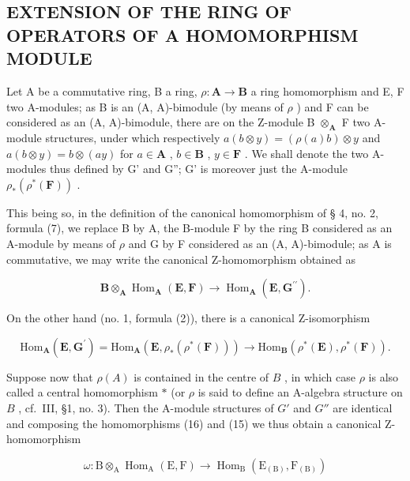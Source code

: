 \subsection{EXTENSION OF THE RING OF OPERATORS OF A HOMOMORPHISM MODULE}

Let A be a commutative ring, B a ring, \(\rho: \mathbf{A} \to \mathbf{B}\) a ring homomorphism and E, F two A-modules; as B is an (A, A)-bimodule (by means of \(\rho\) ) and F can be considered as an (A, A)-bimodule, there are on the Z-module B \(\otimes_{\mathbf{A}}\) F two A-module structures, under which respectively \(a(b \otimes y) = (\rho(a)b) \otimes y\) and \(a(b \otimes y) = b \otimes (ay)\) for \(a \in \mathbf{A}\) , \(b \in \mathbf{B}\) , \(y \in \mathbf{F}\) . We shall denote the two A-modules thus defined by G' and G''; G' is moreover just the A-module \(\rho_*(\rho^*(\mathbf{F}))\) .

This being so, in the definition of the canonical homomorphism of § 4, no. 2, formula (7), we replace B by A, the B-module F by the ring B considered as an A-module by means of \(\rho\) and G by F considered as an (A, A)-bimodule; as A is commutative, we may write the canonical Z-homomorphism obtained as

\[
\mathbf {B} \otimes_ {\mathbf {A}} \operatorname{Hom} _ {\mathbf {A}} (\mathbf {E}, \mathbf {F}) \rightarrow \operatorname{Hom} _ {\mathbf {A}} (\mathbf {E}, \mathbf {G} ^ {\prime \prime}).\tag{15}
\]

On the other hand (no. 1, formula (2)), there is a canonical Z-isomorphism

\[
\mathrm{Hom} _ {\mathbf {A}} (\mathbf {E}, \mathbf {G} ^ {\prime}) = \mathrm{Hom} _ {\mathbf {A}} (\mathbf {E}, \rho_ {*} (\rho^ {*} (\mathbf {F}))) \rightarrow \mathrm{Hom} _ {\mathbf {B}} (\rho^ {*} (\mathbf {E}), \rho^ {*} (\mathbf {F})). \tag {16}
\]

Suppose now that \(\rho(A)\) is contained in the centre of \(B\) , in which case \(\rho\) is also called a central homomorphism \(*\) (or \(\rho\) is said to define an A-algebra structure on \(B\) , cf.~III, §1, no. 3). Then the A-module structures of \(G'\) and \(G''\) are identical and composing the homomorphisms (16) and (15) we thus obtain a canonical Z-homomorphism

\[
\omega : \mathrm{B} \otimes_ {\mathrm{A}} \operatorname{Hom} _ {\mathrm{A}} (\mathrm{E}, \mathrm{F}) \rightarrow \operatorname{Hom} _ {\mathrm{B}} \left(\mathrm{E} _ {(\mathrm{B})}, \mathrm{F} _ {(\mathrm{B})}\right)\tag{17}
\]

